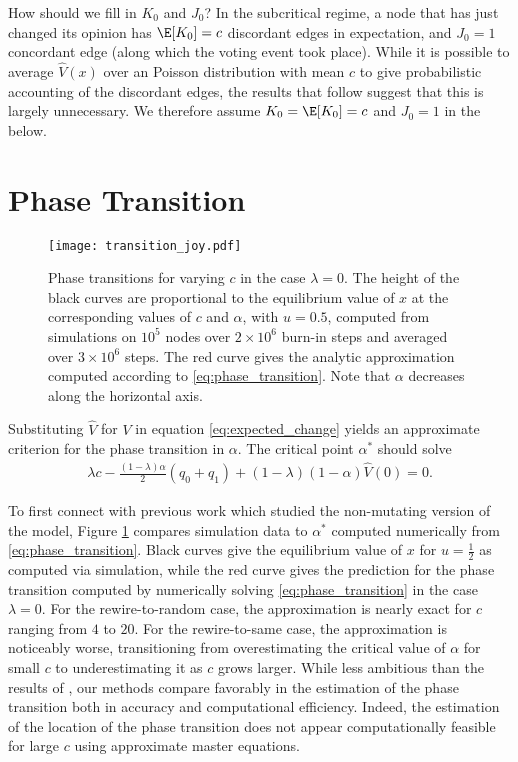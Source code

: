 \documentclass[english]{scrartcl}
\begin{document}
	How should we fill in $K_0$ and $J_0$? In the subcritical regime, a node that has just changed its opinion has $\E[K_0] = c$ discordant edges in expectation, and $J_0 = 1$ concordant edge (along which the voting event took place). While it is possible to average $\hat{V}(x)$ over an Poisson distribution with mean $c$ to give probabilistic accounting of the discordant edges, the results that follow suggest that this is largely unnecessary. We therefore assume $K_0 = \E[K_0] = c$ and $J_0 = 1$ in the below. 


\section{Phase Transition}

	\begin{figure}
		\centering
		\texttt{[image: transition\_joy.pdf]}
		\caption{Phase transitions for varying $c$ in the case $\lambda = 0$. The height of the black curves are proportional to the equilibrium value of $x$ at the corresponding values of $c$ and $\alpha$, with $u = 0.5$, computed from simulations on $10^5$ nodes over $2\times 10^6$ burn-in steps and averaged over $3 \times 10^6$ steps. The red curve gives the analytic approximation computed according to \eqref{eq:phase_transition}. Note that $\alpha$ decreases along the horizontal axis.} \label{fig:detailed_transition}
	\end{figure}

	Substituting $\hat{V}$ for $V$ in equation \eqref{eq:expected_change} yields an approximate criterion for the phase transition in $\alpha$. The critical point $\alpha^*$ should solve
	\begin{align}
		\lambda c - \frac{(1-\lambda)\alpha}{2}(q_0 + q_1) +(1-\lambda)(1-\alpha)\hat{V}(0) = 0. \label{eq:phase_transition}
	\end{align}
	
	To first connect with previous work which studied the non-mutating version of the model, Figure \ref{fig:detailed_transition} compares simulation data to $\alpha^*$ computed numerically from \eqref{eq:phase_transition}. Black curves give the equilibrium value of $x$ for $u = \frac{1}{2}$ as computed via simulation, while the red curve gives the prediction for the phase transition computed by numerically solving \eqref{eq:phase_transition} in the case $\lambda = 0$. For the rewire-to-random case, the approximation is nearly exact for $c$ ranging from $4$ to $20$. For the rewire-to-same case, the approximation is noticeably worse, transitioning from overestimating the critical value of $\alpha$ for small $c$ to underestimating it as $c$ grows larger. While less ambitious than the results of \cite{Durrett2012}, our methods compare favorably in the estimation of the phase transition both in accuracy and computational efficiency. Indeed, the estimation of the location of the phase transition does not appear computationally feasible for large $c$ using approximate master equations. 
\end{document}
